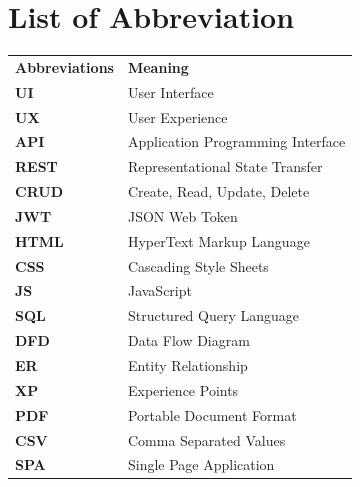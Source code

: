 		\break
		\pagebreak

		\listoffigures
		\break



		\Large
			\begingroup
				\let\clearpage\relax
				\chapter*{List of Abbreviation}
			\endgroup
		    \normalsize
			\begin{table}[h]
				\begin{center}
					\begin{tabular}{l l}
						\textbf{Abbreviations} & \textbf{Meaning} \\
\textbf{UI}   & User Interface \\
\textbf{UX}   & User Experience \\
\textbf{API}  & Application Programming Interface \\
\textbf{REST} & Representational State Transfer \\
\textbf{CRUD} & Create, Read, Update, Delete \\
\textbf{JWT}  & JSON Web Token \\
\textbf{HTML} & HyperText Markup Language \\
\textbf{CSS}  & Cascading Style Sheets \\
\textbf{JS}   & JavaScript \\
\textbf{SQL}  & Structured Query Language \\
\textbf{DFD}  & Data Flow Diagram \\
\textbf{ER}   & Entity Relationship \\
\textbf{XP}   & Experience Points \\
\textbf{PDF}  & Portable Document Format \\
\textbf{CSV}  & Comma Separated Values \\
\textbf{SPA}  & Single Page Application \\
					\end{tabular}
				\end{center}
			\end{table}
		\break
		\pagebreak


